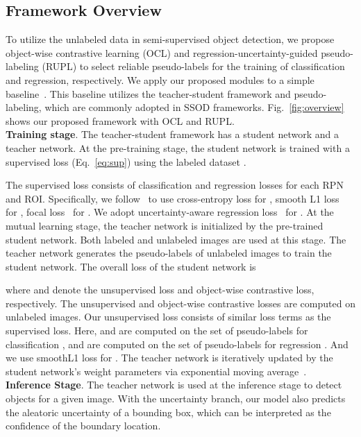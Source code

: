 \documentclass{bmvc2k}
\begin{document}
\subsection{Framework Overview}
\label{sec:overview}
To utilize the unlabeled data in
semi-supervised object detection, we propose object-wise contrastive learning (OCL) and regression-uncertainty-guided pseudo-labeling (RUPL) to select reliable pseudo-labels for the training of classification and regression, respectively. 
We apply our proposed modules to a simple baseline~\cite{liu2021unbiased}. This baseline utilizes the teacher-student framework and pseudo-labeling, which are commonly adopted in SSOD frameworks. Fig.~\ref{fig:overview} shows our proposed framework with OCL and RUPL. \\
\textbf{Training stage}. 
The teacher-student framework has a student network and a teacher network.
At the pre-training stage, the student network is trained with a supervised loss (Eq.~\ref{eq:sup}) using the labeled dataset  .

The supervised loss consists of classification and regression losses for each RPN and ROI.
Specifically, we follow~\cite{liu2021unbiased} to use cross-entropy loss for , smooth L1 loss~\cite{girshick2015fast} for , focal loss~\cite{focalloss} for . We adopt uncertainty-aware regression loss~\cite{whatUncertainty} for .
At the mutual learning stage, the teacher network is initialized by the pre-trained student network.
Both labeled and unlabeled images are used at this stage. The teacher network generates the pseudo-labels of unlabeled images to train the student network. The overall loss of the student network is

where  and  denote the unsupervised loss and object-wise contrastive loss, respectively.
The unsupervised and object-wise contrastive losses are computed on unlabeled images.
Our unsupervised loss consists of similar loss terms as the supervised loss. 
Here,  and  are computed on the set of pseudo-labels for classification ,  and  are computed on the set of pseudo-labels for regression . 
And we use smoothL1 loss for .
The teacher network is iteratively updated by the student network's weight parameters via exponential moving average~\cite{liu2021unbiased}.
\\
\textbf{Inference Stage}. The teacher
network is used at the inference stage to detect objects for a given image. With the uncertainty branch, our model also predicts the aleatoric uncertainty of a bounding box, which can be interpreted as the confidence of the boundary location.
\end{document}
